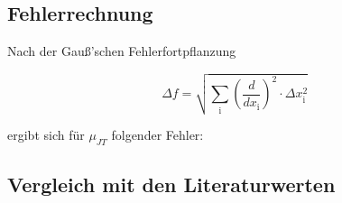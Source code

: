 \documentclass[12pt,a4paper,titlepage,headinclude,bibtotoc]{scrartcl}
\begin{document}



\subsection{Fehlerrechnung}
Nach der Gauß'schen Fehlerfortpflanzung

\begin{equation}
\Delta f = \sqrt{\sum_\mathrm{i} \left(\frac{d}{dx_\mathrm{i}}\right)^{2} \cdot \Delta x_\mathrm{i}^2}
\end{equation}


ergibt sich für $\mu_{JT}$ folgender Fehler:\\








\subsection{Vergleich mit den Literaturwerten}
\end{document}
